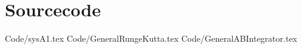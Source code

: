\pagestyle{empty}




\section{Sourcecode}

%
    {Code/sysA1.tex} 
%
    {Code/GeneralRungeKutta.tex}
%
    {Code/GeneralABIntegrator.tex}


 
\bigskip

\noindent\finalVersionString

